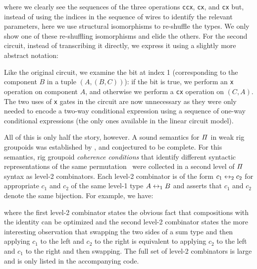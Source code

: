 \medskip

\adder{}

\addertwo{}

\noindent where we clearly see the sequences of the three operations \verb|ccx|, \verb|cx|, and \verb|cx| but, instead
of using the indices in the sequence of wires to identify the relevant parameters, here we use structural isomorphisms
to re-shuffle the types. We only show one of these re-shuffling isomorphisms and elide the others. For the second circuit, instead of transcribing it directly, we express it using
a slightly more abstract notation:

\medskip

\resettwo{}

\noindent Like the original circuit, we examine the bit at index 1 (corresponding to the component $B$ in a tuple
$(A,(B,C))$): if the bit is true, we perform an \verb|x| operation on component $A$, and otherwise we perform a
\verb|cx| operation on $(C,A)$. The two uses of \verb|x| gates in the circuit are now unnecessary as they were only needed
to encode a two-way conditional expression using a sequence of one-way conditional expressions (the only ones available in
the linear circuit model).

All of this is only half the story, however. A sound semantics for $\mathit{\Pi}$ in weak rig
groupoids was established by \citet{caretteComputingSemiringsWeak2016}, and conjectured to be complete. For this
semantics, rig groupoid \emph{coherence conditions} that identify different syntactic representations of the same
permutation~\cite{laplaza72,Carette2016} were collected  in a
second level of $\mathit{\Pi}$ syntax as level-2 combinators.  Each level-2 combinator is of the form $c_1 \leftrightarrow_2 c_2$ for appropriate
$c_1$ and $c_2$ of the same level-1 type $A \leftrightarrow_1 B$ and asserts that $c_1$ and $c_2$ denote the same bijection. For example, we have:

\medskip

\combtwo{}

\noindent where the first level-2 combinator states the obvious fact that compositions with the identity can be
optimized and the second level-2 combinator states the more interesting observation that swapping the two sides of a sum
type and then applying $c_1$ to the left and $c_2$ to the right is equivalent to applying $c_2$ to the left and $c_1$ to
the right and then swapping. The full set of level-2 combinators is large and is only listed in the accompanying code.


